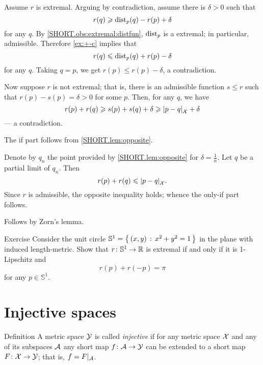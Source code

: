 Assume $r$ is extremal.
Arguing by contradiction, assume there is $\delta>0$ such that
\[r(q)\geqslant \mathrm{dist}_p(q)-r(p)+\delta\]
for any $q$.
By \ref{SHORT.obs:extremal:distfun}, $\mathrm{dist}_p$ is a extremal; in particular, admissible.
Therefore \ref{ex:+-c} implies that
\[r(q)\leqslant \mathrm{dist}_p(q)+r(p)-\delta\]
for any $q$.
Taking $q=p$, we get $r(p)\le r(p)-\delta$, a contradiction.

Now suppose $r$ is not extremal; that is, there is an admissible function $s\le r$ such that $r(p)-s(p)=\delta>0$ for some $p$.
Then, for any $q$, we have
\[r(p)+r(q)\ge s(p)+s(q)+\delta\ge \dist{p}{q}{\spc{X}}+\delta\]
--- a contradiction.

The if part follows from \ref{SHORT.lem:opposite}.

Denote by $q_n$ the point provided by \ref{SHORT.lem:opposite} for $\delta=\tfrac1n$.
Let $q$ be a partial limit of $q_n$. 
Then 
\[r(p)+r(q)\le\dist{p}{q}{\spc{X}}.\]
Since $r$ is admissible, the opposite inequality holds;
whence the only-if part follows.

Follows by Zorn's lemma. 
\qeds

\begin{thm}{Exercise}\label{ex:circle}
Consider the unit circle $\mathbb{S}^1=\left\{\,{(x,y)}\,:\,{x^2+y^2=1}\,\right\}$ in the plane with induced length-metric.
Show that $r\colon\mathbb{S}^1\to\mathbb{R}$ is extremal if and only if it is 1-Lipschitz and 
\[r(p)+r(-p)=\pi\] for any $p\in\mathbb{S}^1$.
\end{thm}

\section{Injective spaces}

\begin{thm}{Definition}\label{def:injective}
A metric space $\mathcal{Y}$ is called \emph{injective} if for any metric space $\mathcal{X}$ and any of its subspaces $\mathcal{A}$
any short map $f\colon\mathcal{A}\to \mathcal{Y}$ can be extended to a short map $F\colon\mathcal{X}\to \mathcal{Y}$;
that is, $f=F|_{\mathcal{A}}$.
\end{thm}

